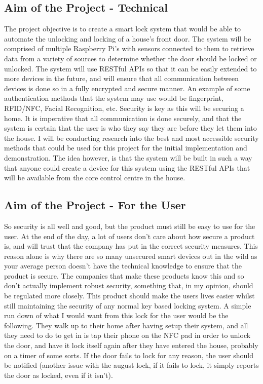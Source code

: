 \subsection{Aim of the Project - Technical}
The project objective is to create a smart lock system that would be able to automate the unlocking and locking of a house's front door. The system will be comprised of multiple Raspberry Pi's with sensors connected to them to retrieve data from a variety of sources to determine whether the door should be locked or unlocked. The system will use RESTful APIs so that it can be easily extended to more devices in the future, and will ensure that all communication between devices is done so in a fully encrypted and secure manner. An example of some authentication methods that the system may use would be fingerprint, RFID/NFC, Facial Recognition, etc.
\newline
\newline
Security is key as this will be securing a home. It is imperative that all communication is done securely, and that the system is certain that the user is who they say they are before they let them into the house. I will be conducting research into the best and most accessible security methods that could be used for this project for the initial implementation and demonstration. The idea however, is that the system will be built in such a way that anyone could create a device for this system using the RESTful APIs that will be available from the core control centre in the house.

\subsection{Aim of the Project - For the User}
So security is all well and good, but the product must still be easy to use for the user. At the end of the day, a lot of users don't care about how secure a product is, and will trust that the company has put in the correct security measures. This reason alone is why there are so many unsecured smart devices out in the wild as your average person doesn't have the technical knowledge to ensure that the product is secure. The companies that make these products know this and so don't actually implement robust security, something that, in my opinion, should be regulated more closely. This product should make the users lives easier whilst still maintaining the security of any normal key based locking system.
\newline
\newline
A simple run down of what I would want from this lock for the user would be the following. They walk up to their home after having setup their system, and all they need to do to get in is tap their phone on the NFC pad in order to unlock the door, and have it lock itself again after they have entered the house, probably on a timer of some sorts. If the door fails to lock for any reason, the user should be notified (another issue with the august lock, if it fails to lock, it simply reports the door as locked, even if it isn't).

